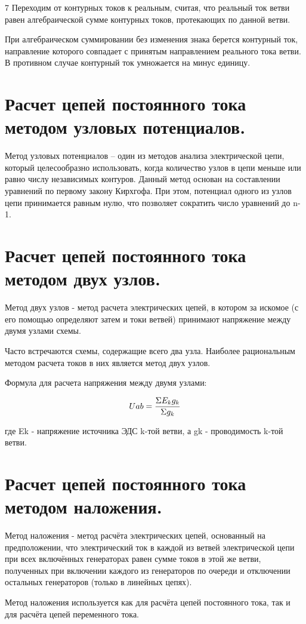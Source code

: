 \documentclass[a4paper, 12pt]{article}
\begin{document}
7 Переходим от контурных токов к реальным, считая, что реальный ток ветви равен алгебраической сумме контурных токов, протекающих по данной ветви.

При алгебраическом суммировании без изменения знака берется контурный ток, направление которого совпадает с принятым направлением реального тока ветви. В противном случае контурный ток умножается на минус единицу. 

\section{Расчет цепей постоянного тока методом узловых потенциалов.}
Метод узловых потенциалов – один из методов анализа электрической цепи, который целесообразно использовать, когда количество узлов в цепи меньше или равно числу независимых контуров. Данный метод основан на составлении уравнений по первому закону Кирхгофа. При этом, потенциал одного из узлов цепи принимается равным нулю, что позволяет сократить число уравнений до n-1.
\section{Расчет цепей постоянного тока методом двух узлов.}
Метод двух узлов - метод расчета электрических цепей, в котором за искомое (с его помощью определяют затем и токи ветвей) принимают напряжение между двумя узлами схемы.

Часто встречаются схемы, содержащие всего два узла. Наиболее рациональным методом расчета токов в них является метод двух узлов.

Формула для расчета напряжения между двумя узлами:

    \[
        U a b = {{\Sigma E_{k}g_{k}} \over {\Sigma g_{k}}}
    \]

где Ek - напряжение источника ЭДС k-той ветви, а gk - проводимость k-той ветви. 
\section{Расчет цепей постоянного тока методом наложения.}
Метод наложения - метод расчёта электрических цепей, основанный на предположении, что электрический ток в каждой из ветвей электрической цепи при всех включённых генераторах равен сумме токов в этой же ветви, полученных при включении каждого из генераторов по очереди и отключении остальных генераторов (только в линейных цепях).

Метод наложения используется как для расчёта цепей постоянного тока, так и для расчёта цепей переменного тока. 
\end{document}
